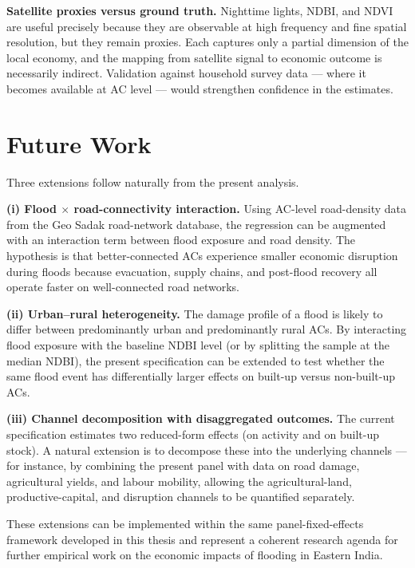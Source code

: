 \documentclass[12pt,a4paper,oneside]{report}
\begin{document}
\textbf{Satellite proxies versus ground truth.} Nighttime lights, NDBI, and NDVI are useful precisely because they are observable at high frequency and fine spatial resolution, but they remain proxies. Each captures only a partial dimension of the local economy, and the mapping from satellite signal to economic outcome is necessarily indirect. Validation against household survey data --- where it becomes available at AC level --- would strengthen confidence in the estimates.

\section{Future Work}
Three extensions follow naturally from the present analysis.

\textbf{(i) Flood $\times$ road-connectivity interaction.} Using AC-level road-density data from the Geo Sadak road-network database, the regression can be augmented with an interaction term between flood exposure and road density. The hypothesis is that better-connected ACs experience smaller economic disruption during floods because evacuation, supply chains, and post-flood recovery all operate faster on well-connected road networks.

\textbf{(ii) Urban--rural heterogeneity.} The damage profile of a flood is likely to differ between predominantly urban and predominantly rural ACs. By interacting flood exposure with the baseline NDBI level (or by splitting the sample at the median NDBI), the present specification can be extended to test whether the same flood event has differentially larger effects on built-up versus non-built-up ACs.

\textbf{(iii) Channel decomposition with disaggregated outcomes.} The current specification estimates two reduced-form effects (on activity and on built-up stock). A natural extension is to decompose these into the underlying channels --- for instance, by combining the present panel with data on road damage, agricultural yields, and labour mobility, allowing the agricultural-land, productive-capital, and disruption channels to be quantified separately.

These extensions can be implemented within the same panel-fixed-effects framework developed in this thesis and represent a coherent research agenda for further empirical work on the economic impacts of flooding in Eastern India.

\clearpage
{}
\end{document}
